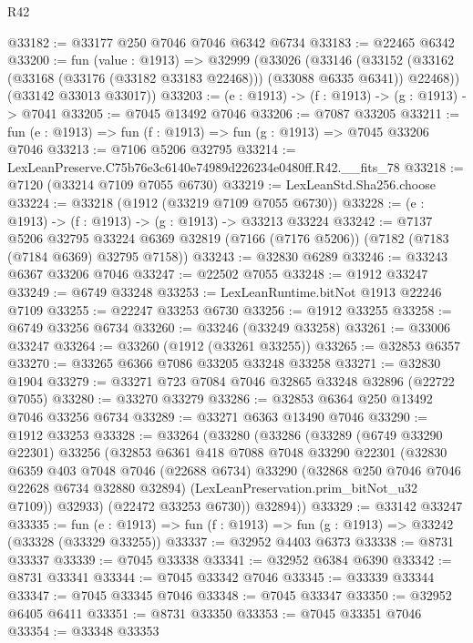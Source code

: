 \begin{lexlean}{R42}
\begin{coremodule}
{@33182 := @33177 @250 @7046 @7046 @6342 @6734
@33183 := @22465 @6342
@33200 := fun (value : @1913) =>
  @32999
    (@33026
      (@33146
        (@33152 (@33162 (@33168 (@33176 (@33182 @33183 @22468))) (@33088 @6335 @6341)) @22468))
      (@33142 @33013 @33017))
@33203 := (e : @1913) -> (f : @1913) -> (g : @1913) -> @7041
@33205 := @7045 @13492 @7046
@33206 := @7087 @33205
@33211 := fun (e : @1913) => fun (f : @1913) => fun (g : @1913) => @7045 @33206 @7046
@33213 := @7106 @5206 @32795
@33214 := LexLeanPreserve.C75b76e3c6140e74989d226234e0480ff.R42.__fits_78
@33218 := @7120 (@33214 @7109 @7055 @6730)
@33219 := LexLeanStd.Sha256.choose
@33224 := @33218 (@1912 (@33219 @7109 @7055 @6730))
@33228 := (e : @1913) -> (f : @1913) -> (g : @1913) -> @33213 @33224
@33242 := @7137
    @5206
    @32795
    @33224
    @6369
    @32819
    (@7166 (@7176 @5206))
    (@7182 (@7183 (@7184 @6369) @32795 @7158))
@33243 := @32830 @6289
@33246 := @33243 @6367 @33206 @7046
@33247 := @22502 @7055
@33248 := @1912 @33247
@33249 := @6749 @33248
@33253 := LexLeanRuntime.bitNot @1913 @22246 @7109
@33255 := @22247 @33253 @6730
@33256 := @1912 @33255
@33258 := @6749 @33256 @6734
@33260 := @33246 (@33249 @33258)
@33261 := @33006 @33247
@33264 := @33260 (@1912 (@33261 @33255))
@33265 := @32853 @6357
@33270 := @33265 @6366 @7086 @33205 @33248 @33258
@33271 := @32830 @1904
@33279 := @33271 @723 @7084 @7046 @32865 @33248 @32896 (@22722 @7055)
@33280 := @33270 @33279
@33286 := @32853 @6364 @250 @13492 @7046 @33256 @6734
@33289 := @33271 @6363 @13490 @7046
@33290 := @1912 @33253
@33328 := @33264
    (@33280
      (@33286
        (@33289
          (@6749 @33290 @22301)
          @33256
          (@32853
            @6361
            @418
            @7088
            @7048
            @33290
            @22301
            (@32830
              @6359
              @403
              @7048
              @7046
              (@22688 @6734)
              @33290
              (@32868 @250 @7046 @7046 @22628 @6734 @32880 @32894)
              (LexLeanPreservation.prim_bitNot_u32 @7109))
            @32933)
          (@22472 @33253 @6730))
        @32894))
@33329 := @33142 @33247
@33335 := fun (e : @1913) => fun (f : @1913) => fun (g : @1913) => @33242 (@33328 (@33329 @33255))
@33337 := @32952 @4403 @6373
@33338 := @8731 @33337
@33339 := @7045 @33338
@33341 := @32952 @6384 @6390
@33342 := @8731 @33341
@33344 := @7045 @33342 @7046
@33345 := @33339 @33344
@33347 := @7045 @33345 @7046
@33348 := @7045 @33347
@33350 := @32952 @6405 @6411
@33351 := @8731 @33350
@33353 := @7045 @33351 @7046
@33354 := @33348 @33353
}
\end{coremodule}
\end{lexlean}
